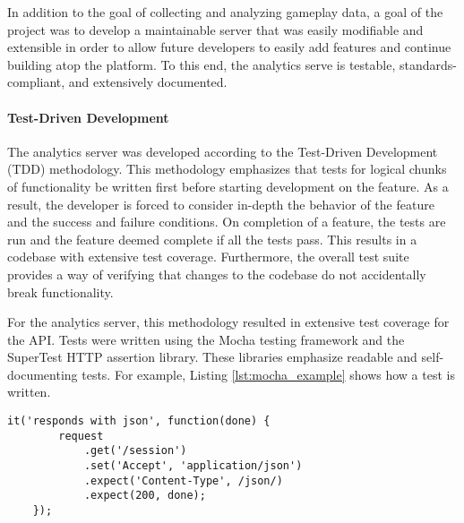 In addition to the goal of collecting and analyzing gameplay data, a goal of the project was to develop a maintainable server that was easily modifiable and extensible in order to allow future developers to easily add features and continue building atop the platform. To this end, the analytics serve is testable, standards-compliant, and extensively documented.


\paragraph{Test-Driven Development}

The analytics server was developed according to the Test-Driven Development (TDD) methodology. This methodology emphasizes that tests for logical chunks of functionality be written first before starting development on the feature. As a result, the developer is forced to consider in-depth the behavior of the feature and the success and failure conditions. On completion of a feature, the tests are run and the feature deemed complete if all the tests pass. This results in a codebase with extensive test coverage. Furthermore, the overall test suite provides a way of verifying that changes to the codebase do not accidentally break functionality. 

For the analytics server, this methodology resulted in extensive test coverage for the API. Tests were written using the Mocha testing framework and the SuperTest HTTP assertion library. These libraries emphasize readable and self-documenting tests. For example, Listing \ref{lst:mocha_example} shows how a test is written.

\medskip
\begin{lstlisting}[caption=Example Mocha test{,} testing that the Session API responds in JSON, label={lst:mocha_example}]
	it('responds with json', function(done) {
		request
			.get('/session')
			.set('Accept', 'application/json')
			.expect('Content-Type', /json/)
			.expect(200, done);
	});
\end{lstlisting}


	




















